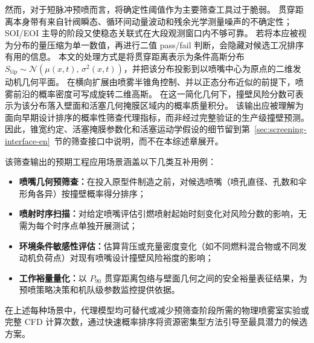 然而，对于短脉冲预喷而言，将确定性阈值作为主要筛查工具过于脆弱。
贯穿距离本身带有来自针阀瞬态、循环间动量波动和残余光学测量噪声的不确定性；SOI/EOI 主导的阶段又使稳态关联式在大段观测窗口内不够可靠。
若将本应被视为分布的量压缩为单一数值，再进行二值 pass/fail 判断，会隐藏对候选工况排序有用的信息。
本文的处理方式是将贯穿距离表示为条件高斯分布 \(S_\mathrm{tip}\sim\mathcal{N}(\mu(x,t),\,\sigma^2(x,t))\)，并把该分布投影到以喷嘴中心为原点的二维发动机几何平面。
在横向扩展由喷雾半锥角控制、并以正态分布近似的前提下，喷雾前沿的概率密度可写成旋转二维高斯。
在这一简化几何下，撞壁风险分数可表示为该分布落入壁面和活塞几何掩膜区域内的概率质量积分。
该输出应被理解为面向早期设计排序的概率性筛查代理指标，而非经过完整验证的生产级撞壁预测。
因此，锥宽约定、活塞掩膜参数化和活塞运动学假设的细节留到第~\ref{sec:screening-interface-en}~节的筛查接口中说明，而不在本综述章展开。

该筛查输出的预期工程应用场景涵盖以下几类互补用例：
\begin{itemize}
  \item \textbf{喷嘴几何预筛查：}在投入原型件制造之前，对候选喷嘴（喷孔直径、孔数和伞形角各异）按撞壁概率得分排序；
  \item \textbf{喷射时序扫描：}对给定喷嘴评估引燃喷射起始时刻变化对风险分数的影响，无需为每个时序点单独开展测试；
  \item \textbf{环境条件敏感性评估：}估算背压或充量密度变化（如不同燃料混合物或不同发动机负荷点）对现有喷嘴设计撞壁风险裕度的影响；
  \item \textbf{工作裕量量化：}以 $P_{90}$ 贯穿距离包络与壁面几何之间的安全裕量表征结果，为预喷策略决策和机队级参数监控提供依据。
\end{itemize}
在上述每种场景中，代理模型均可替代或减少预筛查阶段所需的物理喷雾室实验或完整 CFD 计算次数，通过快速概率排序将资源密集型方法引导至最具潜力的候选方案。

